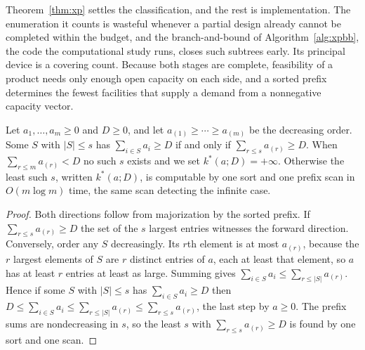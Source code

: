 Theorem~\ref{thm:xp} settles the classification, and the rest is
implementation. The enumeration it counts is wasteful whenever a
partial design already cannot be
completed within the budget, and the branch-and-bound of
Algorithm~\ref{alg:xpbb}, the code the computational study runs,
closes such subtrees early. Its principal device
is a covering count. Because both stages are complete, feasibility of a
product needs only enough open capacity on each side, and a sorted prefix
determines the fewest facilities that supply a demand from a nonnegative
capacity vector.

\begin{lemma}\label{lem:cover}
Let $a_1,\dots,a_m\ge 0$ and $D\ge 0$, and let
$a_{(1)}\ge\cdots\ge a_{(m)}$ be the decreasing order. Some $S$ with
$|S|\le s$ has $\sum_{i\in S}a_i\ge D$ if and only if
$\sum_{r\le s}a_{(r)}\ge D$. When $\sum_{r\le m}a_{(r)}<D$ no such $s$
exists and we set $k^\ast(a;D)=+\infty$. Otherwise the least such $s$,
written $k^\ast(a;D)$, is computable by one sort and one prefix scan in
$O(m\log m)$ time, the same scan detecting the infinite case.
\end{lemma}
\begin{proof}
Both directions follow from majorization by the sorted prefix. If
$\sum_{r\le s}a_{(r)}\ge D$ the set of the $s$ largest entries witnesses
the forward direction. Conversely, order any $S$ decreasingly. Its $r$th
element is at most $a_{(r)}$, because the $r$ largest elements of $S$ are
$r$ distinct entries of $a$, each at least that element, so $a$ has at
least $r$ entries at least as large. Summing gives
$\sum_{i\in S}a_i\le\sum_{r\le|S|}a_{(r)}$.
Hence if some $S$ with $|S|\le s$ has $\sum_{i\in S}a_i\ge D$ then
$D\le\sum_{i\in S}a_i\le\sum_{r\le|S|}a_{(r)}\le\sum_{r\le s}a_{(r)}$, the
last step by $a\ge 0$. The prefix sums are nondecreasing in $s$, so the
least $s$ with $\sum_{r\le s}a_{(r)}\ge D$ is found by one sort and one
scan.
\end{proof}

